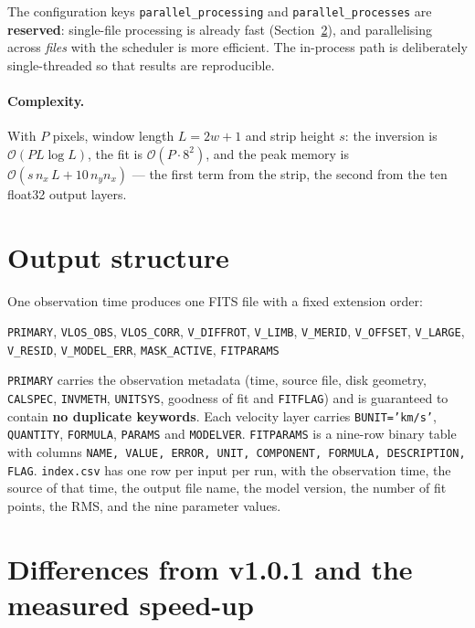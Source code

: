 \documentclass[11pt,a4paper]{article}
\newcommand{\code}[1]{\texttt{\small #1}}
\begin{document}
\noindent
The configuration keys \code{parallel\_processing} and
\code{parallel\_processes} are \textbf{reserved}: single-file processing is
already fast (Section~\ref{sec:speed}), and parallelising across \emph{files}
with the scheduler is more efficient.  The in-process path is deliberately
single-threaded so that results are reproducible.

\paragraph{Complexity.}
With $P$ pixels, window length $L = 2w+1$ and strip height $s$: the inversion is
$\mathcal{O}(P L\log L)$, the fit is $\mathcal{O}(P\cdot 8^2)$, and the peak
memory is $\mathcal{O}(s\,n_x\,L + 10\,n_y n_x)$ --- the first term from the
strip, the second from the ten float32 output layers.

\section{Output structure}
\label{sec:output}

One observation time produces one FITS file with a fixed extension order:
\begin{center}
\code{PRIMARY}, \code{VLOS\_OBS}, \code{VLOS\_CORR}, \code{V\_DIFFROT},
\code{V\_LIMB}, \code{V\_MERID}, \code{V\_OFFSET}, \code{V\_LARGE},
\code{V\_RESID}, \code{V\_MODEL\_ERR}, \code{MASK\_ACTIVE}, \code{FITPARAMS}
\end{center}

\code{PRIMARY} carries the observation metadata (time, source file, disk
geometry, \code{CALSPEC}, \code{INVMETH}, \code{UNITSYS}, goodness of fit and
\code{FITFLAG}) and is guaranteed to contain \textbf{no duplicate keywords}.
Each velocity layer carries \code{BUNIT='km/s'}, \code{QUANTITY},
\code{FORMULA}, \code{PARAMS} and \code{MODELVER}.  \code{FITPARAMS} is a
nine-row binary table with columns \code{NAME, VALUE, ERROR, UNIT, COMPONENT,
FORMULA, DESCRIPTION, FLAG}.  \code{index.csv} has one row per input per run,
with the observation time, the source of that time, the output file name, the
model version, the number of fit points, the RMS, and the nine parameter values.

\section{Differences from v1.0.1 and the measured speed-up}
\label{sec:speed}
\end{document}
